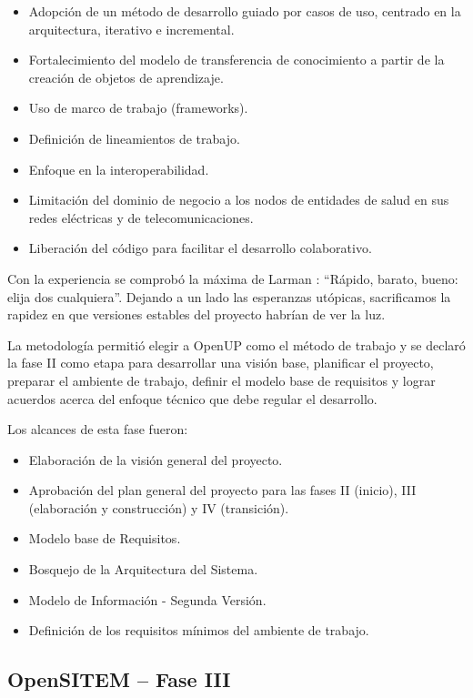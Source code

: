 \begin{itemize}
 \item Adopción de un método de desarrollo guiado por casos de uso, centrado en la arquitectura, iterativo e incremental.
 \item Fortalecimiento del modelo de transferencia de conocimiento a partir de la creación de objetos de aprendizaje.
 \item Uso de marco de trabajo (frameworks).
 \item Definición de lineamientos de trabajo.
 \item Enfoque en la interoperabilidad.
 \item Limitación del dominio de negocio a los nodos de entidades de salud en sus redes eléctricas y de telecomunicaciones.
 \item Liberación del código para facilitar el desarrollo colaborativo.
\end{itemize}

Con la experiencia se comprobó la máxima de Larman \cite{larman2003} : “Rápido, barato, bueno: elija dos cualquiera”. Dejando a un lado las esperanzas utópicas, sacrificamos la rapidez en que versiones estables del proyecto habrían de ver la luz.

La metodología permitió elegir a OpenUP como el método de trabajo y se declaró la fase II como etapa para desarrollar una visión base, planificar el proyecto, preparar el ambiente de trabajo, definir el modelo base de requisitos y lograr acuerdos acerca del enfoque técnico que debe regular el desarrollo.

Los alcances de esta fase fueron:
\begin{itemize}
\item Elaboración de la visión general del proyecto.
\item Aprobación del plan general del proyecto para las fases II (inicio), III (elaboración y construcción) y IV (transición).
\item Modelo base de Requisitos.
\item Bosquejo de la Arquitectura del Sistema.
\item Modelo de Información - Segunda Versión.
\item Definición de los requisitos mínimos del ambiente de trabajo.
\end{itemize}

\subsection{OpenSITEM – Fase III}

